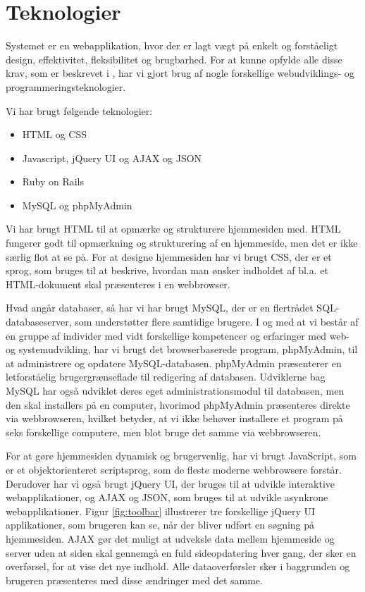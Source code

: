 \section{Teknologier}
\label{sec:teknologier}
Systemet er en webapplikation, hvor der er lagt vægt på enkelt og forståeligt design, effektivitet, fleksibilitet og brugbarhed. For at kunne opfylde alle disse krav, som er beskrevet i , har vi gjort brug af nogle forskellige webudviklings- og programmeringsteknologier.

Vi har brugt følgende teknologier:

\begin{itemize}[noitemsep]
\item HTML og CSS
\item Javascript, jQuery UI og AJAX og JSON
\item Ruby on Rails
\item MySQL og phpMyAdmin
\end{itemize}

Vi har brugt HTML\cite{htmlwiki} til at opmærke og strukturere hjemmesiden med. HTML fungerer godt til opmærkning og strukturering af en hjemmeside, men det er ikke særlig flot at se på. For at designe hjemmesiden har vi brugt CSS\cite{csswiki}, der er et sprog, som bruges til at beskrive, hvordan man ønsker indholdet af bl.a. et HTML-dokument skal præsenteres i \fx en webbrowser.

Hvad angår databaser, så har vi har brugt MySQL\cite{mysqlwiki}, der er en flertrådet SQL-databaseserver, som understøtter flere samtidige brugere. I og med at vi består af en gruppe af individer med vidt forskellige kompetencer og erfaringer med web- og systemudvikling, har vi brugt det browserbaserede program, phpMyAdmin\cite{phpmyadminwiki}, til at administrere og opdatere MySQL-databasen. phpMyAdmin præsenterer en letforståelig brugergrænseflade til redigering af databasen. Udviklerne bag MySQL har også udviklet deres eget administrationsmodul til databasen, men den skal installers på en computer, hvorimod phpMyAdmin præsenteres direkte via webbrowseren, hvilket betyder, at vi ikke behøver installere et program på seks forskellige computere, men blot bruge det samme via webbrowseren.

For at gøre hjemmesiden dynamisk og brugervenlig, har vi brugt JavaScript\cite{javascriptwiki}, som er et objektorienteret scriptsprog, som de fleste moderne webbrowsere forstår. Derudover har vi også brugt jQuery UI\cite{jqueryuiwiki}, der bruges til at udvikle interaktive webapplikationer, og AJAX\cite{ajaxwiki} og JSON\cite{jsonwiki}, som bruges til at udvikle asynkrone webapplikationer. Figur \ref{fig:toolbar} illustrerer tre forskellige jQuery UI applikationer, som brugeren kan se, når der bliver udført en søgning på hjemmesiden. AJAX gør det muligt at udveksle data mellem hjemmeside og server uden at siden skal gennemgå en fuld sideopdatering hver gang, der sker en overførsel, for at vise det nye indhold. Alle dataoverførsler sker i baggrunden og brugeren præsenteres med disse ændringer med det samme.

